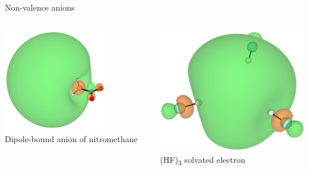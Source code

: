 \documentclass[9pt,t,xcolor=table]{beamer}
\begin{document}
\begin{frame}{\huge Non-valence anions}
\begin{columns}
\begin{column}{0.3\textwidth}
			\includegraphics[width=0.7\textwidth]{Figs/MeNO2_DBS.png}\\
			\vspace{3pt}
    		\small Dipole-bound anion of nitromethane
		\end{column}
		\begin{column}{0.27\textwidth}
			\centering
			\includegraphics[width=\textwidth]{Figs/hf3.png}\\
			\vspace{3pt}
			\small (HF)\textsubscript{3} solvated electron
		\end{column}	
	\end{columns}
\end{frame}
\end{document}

